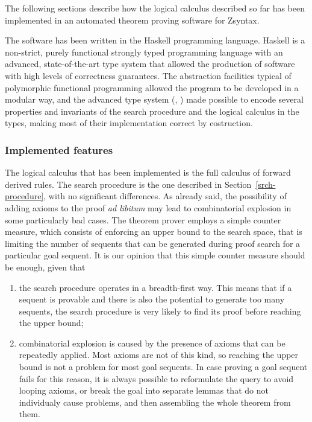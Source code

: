 The following sections describe how the logical calculus described so far has
been implemented in an automated theorem proving software for Zsyntax.

The software has been written in the Haskell programming language.
Haskell is a non-strict, purely functional strongly typed programming language
\cite{a-history-of-haskell}
with an advanced, state-of-the-art type system that allowed the production of
software with high levels of correctness guarantees.
The abstraction facilities typical of polymorphic functional programming allowed
the program to be developed in a modular way, and the advanced type system
(\cite{gadts}, \cite{dependent-haskell})
made possible to encode several properties and invariants of the search
procedure and the logical calculus in the types, making most of their
implementation correct by costruction.

\subsubsection{Implemented features}

The logical calculus that has been implemented is the full calculus of forward
derived rules. The search procedure is the one described in
Section~\ref{srch-procedure}, with no significant differences.  As already
said, the possibility of adding axioms to the proof \emph{ad libitum} may lead
to combinatorial explosion in some particularly bad cases.  The theorem prover
employs a simple counter measure, which consists of enforcing an upper bound to
the search space, that is limiting the number of sequents that can be generated
during proof search for a particular goal sequent.  It is our opinion that this
simple counter measure should be enough, given that

\begin{enumerate}
\item the search procedure operates in a breadth-first way. This means that if a
  sequent is provable and there is also the potential to generate too many
  sequents, the search procedure is very likely to find its proof before reaching
  the upper bound;
\item combinatorial explosion is caused by the presence of axioms that can be
  repeatedly applied. Most axioms are not of this kind, so reaching the upper
  bound is not a problem for most goal sequents. In case proving a goal sequent
  fails for this reason, it is always possible to reformulate the query to avoid
  looping axioms, or break the goal into separate lemmas that do not individualy
  cause problems, and then assembling the whole theorem from them.
\end{enumerate}

